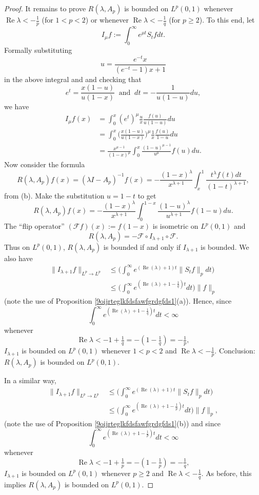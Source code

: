 \documentclass[10pt,a4paper]{amsart}
\renewcommand{\Re}[1]{\operatorname{Re} #1 }
\renewcommand{\geq}{\geqslant}
\renewcommand{\leq}{\leqslant}
\begin{document}
\begin{proof}
It remains to prove $R(\lambda,A_p)$ is bounded on $L^{p}(0,1)$ whenever $\Re \lambda <-\frac{1}{p}$ (for $1 < p < 2$) or whenever $\Re \lambda < -\frac{1}{q}$ (for $p \geq 2$). To this end, let 
$$I_{\mu} f:=\int_{0}^{\infty}e^{\mu t}S_{t}fdt.$$
Formally substituting 
$$u=\frac{e^{-t}x}{(e^{-t}-1)x+1}$$
in the above integral and 
and checking that 
$$e^{t} = \frac{x(1 - u)}{u (1 - x)} \;  \; \mbox{and} \; \; dt = - \frac{1}{u (1 - u)} du,$$
 we   have 
\begin{align*}
I_{\mu}f(x)& =\int_{0}^{x}(e^{t})^{\mu}\frac{u}{x}\frac{f(u)}{u(1-u)}du\\ & =\int_{0}^{x}\bigg(\frac{x(1-u)}{u(1-x)}\bigg)^{\mu}\frac{1}{x}\frac{f(u)}{1-u}du\\
&=\frac{x^{\mu-1}}{(1-x)^{\mu}}\int_{0}^{x}\frac{(1-u)^{\mu-1}}{u^{\mu}}f(u)du.
\end{align*}
Now consider the formula 
$$R(\lambda,A_p)f(x)=(\lambda I-A_p)^{-1}f(x)=-\frac{(1-x)^{\lambda}}{x^{\lambda+1}}\int_{x}^{1}\frac{t^{\lambda}f(t)dt}{(1-t)^{\lambda+1}},$$
from (b). 
Make the substitution $u=1-t$ to get 
$$R(\lambda,A_p)f(x)=-\frac{(1-x)^{\lambda}}{x^{\lambda+1}}\int_{0}^{1-x}\frac{(1-u)^{\lambda}}{u^{\lambda+1}}f(1-u)du.$$
The  ``flip operator''
$(\mathcal{F}f)(x):=f(1-x)$
is isometric on $L^p(0, 1)$ and 
$$R(\lambda,A_p)=-\mathcal{F}\circ I_{\lambda+1}\circ\mathcal{F}.$$
Thus  on $L^p(0, 1)$, $R(\lambda,A_p)$ is bounded if and only if  $I_{\lambda+1}$ is bounded. We also have 
\begin{align*}
\| I_{\lambda+1}f\|_{L^p \to L^p}  & \leq\bigg(\int_{0}^{\infty}e^{(\Re (\lambda)+1)t}\| S_{t}f\|_{p}dt\bigg)\\
 & \leq\bigg(\int_{0}^{\infty}e^{(\Re(\lambda)+1-\frac{1}{q})t}dt\bigg)  \|f\|_p
 \end{align*}
(note the use of Proposition \ref{9oijrteglkfdsfawfgrdgfds1}(a)). Hence, since  
$$\int_{0}^{\infty}e^{(\Re(\lambda)+1-\frac{1}{q})t}dt<\infty$$ whenever 
$$\Re \lambda <-1+\tfrac{1}{q}=-(1-\tfrac{1}{q})=-\tfrac{1}{p},$$ $I_{\lambda+1}$ is bounded on $L^{p}(0, 1)$ whenever $1 < p < 2$ and $\Re \lambda<-\frac{1}{p}$. Conclusion: $R(\lambda,A_p)$ is bounded on $L^{p}(0, 1)$. 


In a similar way, 
\begin{align*}
\| I_{\lambda+1}f\|_{L^p \to L^p}  & \leq\bigg(\int_{0}^{\infty}e^{(\Re (\lambda)+1)t}\| S_{t}f\|_{p}dt\bigg)\\
 & \leq\bigg(\int_{0}^{\infty}e^{(\Re(\lambda)+1-\frac{1}{p})t}dt\bigg)  \|f\|_p,
 \end{align*}
 (note the use of Proposition \ref{9oijrteglkfdsfawfgrdgfds1}(b)) 
 and since 
$$\int_{0}^{\infty}e^{(\Re(\lambda)+1-\frac{1}{p})t}dt<\infty$$ whenever 
$$\Re \lambda <-1+\tfrac{1}{p}=-(1-\tfrac{1}{p})=-\tfrac{1}{q},$$  $I_{\lambda+1}$ is bounded on $L^{p}(0, 1)$ whenever $p \geq 2$ and $\Re \lambda<-\frac{1}{q}$. As before, this implies $R(\lambda,A_p)$ is bounded on $L^{p}(0, 1)$. 
\end{proof}
\end{document}
